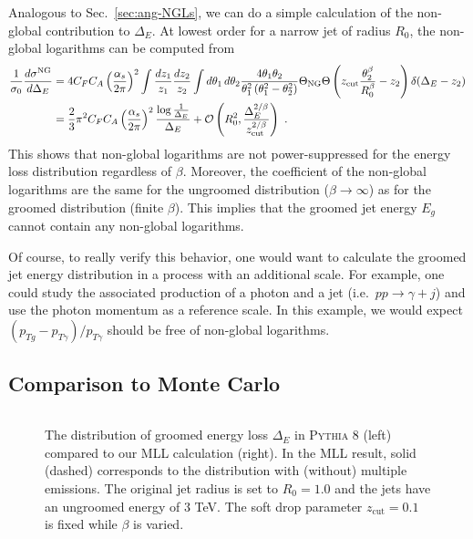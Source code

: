 \documentclass[letterpaper,11pt]{article}
\newcommand{\zcut}{z_\text{cut}}
\DeclareRobustCommand{\Sec}[1]{Sec.~\ref{#1}}
\newcommand{\pythia}[1]{\textsc{Pythia\xspace #1}}
\begin{document}
Analogous to \Sec{sec:ang-NGLs}, we can do a simple calculation of the non-global contribution to $\Delta_E$.
At lowest order for a narrow jet of radius $R_0$, the non-global logarithms can be computed from
\begin{align}
\frac{1}{\sigma_0}\frac{d\sigma^\text{NG}}{d\Delta_E} &= 4 C_F C_A \left( \frac{\alpha_s}{2\pi} \right)^2 \int \frac{dz_1}{z_1}\frac{dz_2}{z_2} \int d\theta_1 \, d\theta_2 \frac{4 \theta_1\theta_2}{\theta_1^2\left(  \theta_1^2 - \theta_2^2 \right)} \Theta_\text{NG}\Theta\left(\zcut\frac{\theta_2^\beta}{R_0^\beta} - z_2 \right)  \delta(\Delta_E - z_2) \nonumber\\
&=\frac{2}{3}\pi^2 C_F C_A \left( \frac{\alpha_s}{2\pi} \right)^2 \frac{\log\frac{1}{\Delta_E}}{\Delta_E}+{\cal O}\left(R_0^2,\frac{\Delta_E^{2/\beta}}{\zcut^{2/\beta}}\right) \ .
\end{align}
This shows that non-global logarithms are not power-suppressed for the energy loss distribution regardless of $\beta$.  Moreover, the coefficient of the non-global logarithms are the same for the ungroomed distribution ($\beta \to \infty$) as for the groomed distribution (finite $\beta$).  This implies that the groomed jet energy $E_g$ cannot contain any non-global logarithms.  

Of course, to really verify this behavior, one would want to calculate the groomed jet energy distribution in a process with an additional scale.  For example, one could study the associated production of a photon and a jet (i.e.~$p p \to \gamma +j$) and use the photon momentum as a reference scale.  In this example, we would expect $(p_{Tg} - p_{T\gamma}) / p_{T\gamma}$ should be free of non-global logarithms.



\subsection{Comparison to Monte Carlo}

\begin{figure}[]
\begin{center}
$\quad$
\end{center}
\caption{
The distribution of groomed energy loss $\Delta_E$ in \pythia{8} (left) compared to our MLL calculation (right).  In the MLL result, solid (dashed) corresponds to the distribution with (without) multiple emissions.  The original jet radius is set to  $R_0 = 1.0$ and the jets have an ungroomed energy of $3$ TeV.  The soft drop parameter $z_\text{cut}=0.1$ is fixed while $\beta$ is varied.
}
\label{fig:eloss_dist}
\end{figure}
\end{document}
